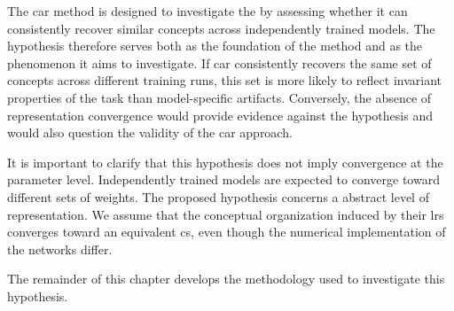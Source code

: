 The \gls{car} method is designed to investigate the \RepresentationConvergenceHypothesisName by assessing whether it can consistently recover similar concepts across independently trained models.
The hypothesis therefore serves both as the foundation of the method and as the phenomenon it aims to investigate.
If \gls{car} consistently recovers the same set of concepts across different training runs, this set is more likely to reflect invariant properties of the task than model-specific artifacts.
Conversely, the absence of representation convergence would provide evidence against the hypothesis and would also question the validity of the \gls{car} approach.

It is important to clarify that this hypothesis does not imply convergence at the parameter level.
Independently trained models are expected to converge toward different sets of weights.
The proposed hypothesis concerns a abstract level of representation.
We assume that the conceptual organization induced by their \glspl{lr} converges toward an equivalent \gls{cs}, even though the numerical implementation of the networks differ.

The remainder of this chapter develops the methodology used to investigate this hypothesis.

